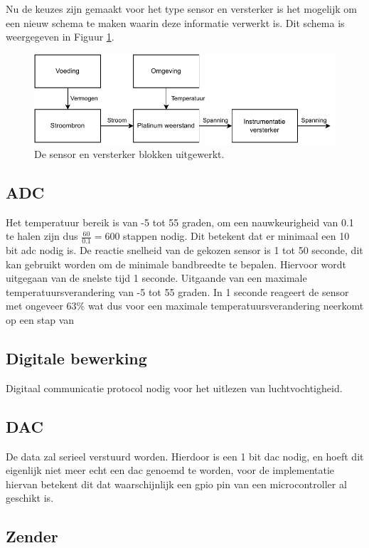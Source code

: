 Nu de keuzes zijn gemaakt voor het type sensor en versterker is het mogelijk om een nieuw schema te maken waarin deze informatie verwerkt is. Dit schema is weergegeven in Figuur \ref{fig:Sensor_schematic_circuit_niveau}.

\begin{figure}[H]
    \centering
    \includegraphics[width=0.8\linewidth]{pictures/Circuit_nivea_schema.drawio.pdf}
    \caption{De sensor en versterker blokken uitgewerkt.}
    \label{fig:Sensor_schematic_circuit_niveau}
\end{figure}

\subsection{ADC}
Het temperatuur bereik is van -5 tot 55 graden, om een nauwkeurigheid van 0.1 te halen zijn dus $\frac{60}{0.1}= 600$ stappen nodig. Dit betekent dat er minimaal een 10 bit adc nodig is. De reactie snelheid van de gekozen sensor is 1 tot 50 seconde, dit kan gebruikt worden om de minimale bandbreedte te bepalen. Hiervoor wordt uitgegaan van de snelste tijd 1 seconde. Uitgaande van een maximale temperatuursverandering van -5 tot 55 graden. In 1 seconde reageert de sensor met ongeveer 63\% wat dus voor een maximale temperatuursverandering neerkomt op een stap van 

\subsection{Digitale bewerking}
Digitaal communicatie protocol nodig voor het uitlezen van luchtvochtigheid.


\subsection{DAC}
De data zal serieel verstuurd worden. Hierdoor is een 1 bit dac nodig, en hoeft dit eigenlijk niet meer echt een dac genoemd te worden, voor de implementatie hiervan betekent dit dat waarschijnlijk een gpio pin van een microcontroller al geschikt is.
\subsection{Zender}